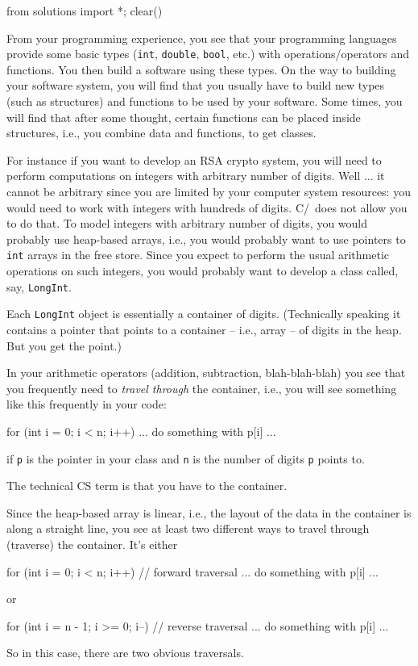 \begin{python0}
from solutions import *; clear()
\end{python0}

From your programming experience, you see that your programming languages
provide some basic types (\verb!int!, \verb!double!, \verb!bool!, etc.)
with operations/operators and functions.
You then build a 
software using these types.
On the way to building your software system, you will find that 
you usually have to build new types 
(such as structures) and functions to be used by your software.
Some times, you will find that after some thought, certain functions
can be placed inside structures, i.e., you combine data and functions,
to get classes.

For instance if you want to develop an RSA crypto system,
you will need to perform computations on 
integers with arbitrary number of
digits. 
Well ... it cannot be arbitrary since you are limited by 
your computer system resources:
you would need to work with integers with hundreds of digits.
C/\cpp\ does not allow you to do that.
To model integers with arbitrary number of digits, you would probably use
heap-based arrays, i.e., you would probably want to use pointers to 
\verb!int! arrays in the free store.
Since you expect to perform the usual arithmetic operations on 
such integers, you would probably want to develop a class
called, say, \verb!LongInt!.

Each \verb!LongInt! object is essentially a container of digits.
(Technically speaking it contains a pointer that points to 
a container -- i.e., array -- of digits in the heap.
But you get the point.)

In your arithmetic operators (addition, subtraction, blah-blah-blah)
you see that you frequently need to \textit{travel through} the container, 
i.e., you will see something like this frequently in your code:
\begin{console}[fontsize=\footnotesize]
for (int i = 0; i < n; i++)
{
    ... do something with p[i] ...
}
\end{console}
if \verb!p! is the pointer in your class and \verb!n! is the number of
digits \verb!p! points to.

The technical CS term is that you have to  the container.

Since the heap-based array is linear, i.e., the layout of the data
in the container is along a straight line,
you see at least two different ways to travel through (traverse) the 
container.
It's either
\begin{console}[fontsize=\footnotesize]
for (int i = 0; i < n; i++) // forward traversal
{
    ... do something with p[i] ...
}
\end{console}
or
\begin{console}[fontsize=\footnotesize]
for (int i = n - 1; i >= 0; i--) // reverse traversal
{
    ... do something with p[i] ...
}
\end{console}
So in this case, there are two obvious traversals.

